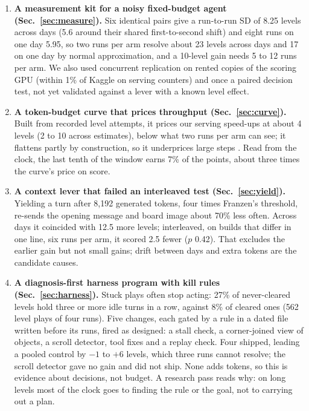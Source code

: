 \begin{enumerate}\setlength{\itemsep}{2pt}
\item \textbf{A measurement kit for a noisy fixed-budget agent (Sec.~\ref{sec:measure}).}
Six identical pairs give a run-to-run SD of 8.25 levels across days (5.6 around their shared first-to-second shift) and eight runs on one day 5.95, so two runs per arm resolve about 23 levels across days and 17 on one day by normal approximation, and a 10-level gain needs 5 to 12 runs per arm. %
We also used concurrent replication on rented copies of the scoring GPU (within 1\% of Kaggle on serving counters) and once a paired decision test, not yet validated against a lever with a known level effect. %

\item \textbf{A token-budget curve that prices throughput (Sec.~\ref{sec:curve}).}
Built from recorded level attempts, it prices our serving speed-ups at about 4 levels (2 to 10 across estimates), below what two runs per arm can see; it flattens partly by construction, so it underprices large steps \citep{shah2026lottery}. %
Read from the clock, the last tenth of the window earns 7\% of the points, about three times the curve's price on score. %

\item \textbf{A context lever that failed an interleaved test (Sec.~\ref{sec:yield}).}
Yielding a turn after 8,192 generated tokens, four times Franzen's threshold, re-sends the opening message and board image about 70\% less often. %
Across days it coincided with 12.5 more levels; interleaved, on builds that differ in one line, six runs per arm, it scored 2.5 fewer ($p$ 0.42). %
That excludes the earlier gain but not small gains; drift between days and extra tokens are the candidate causes.

\item \textbf{A diagnosis-first harness program with kill rules (Sec.~\ref{sec:harness}).}
Stuck plays often stop acting: 27\% of never-cleared levels hold three or more idle turns in a row, against 8\% of cleared ones (562 level plays of four runs). %
Five changes, each gated by a rule in a dated file written before its runs, fired as designed: a stall check, a corner-joined view of objects, a scroll detector, tool fixes and a replay check. %
Four shipped, leading a pooled control by $-1$ to $+6$ levels, which three runs cannot resolve; the scroll detector gave no gain and did not ship. %
None adds tokens, so this is evidence about decisions, not budget. A research pass reads why: on long levels most of the clock goes to finding the rule or the goal, not to carrying out a plan. %


\end{enumerate}

